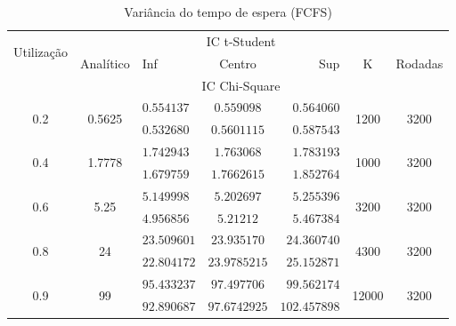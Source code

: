 \documentclass[a4paper]{article}
\begin{document}
\begin{table}[h!]
    \centering
    \begin{tabular}{|c|c|lcr|c|c|}\hline
        \multirow{2}{4.35em}{Utilização}
            & \multirow{3}{3.95em}{Analítico}
            & \multicolumn{3}{|c|}{IC t-Student}
            & \multirow{3}{1em}{K}
            & \multirow{3}{3.75em}{Rodadas} \\
        && Inf & Centro & Sup &&\\
        && \multicolumn{3}{|c|}{IC Chi-Square} &&\\\hline
        \multirow{2}{2em}{0.2}
            &\multirow{2}{3em}{0.5625}
            &$ 0.554137 $&$ 0.559098 $&$ 0.564060 $
            &\multirow{2}{2em}{1200} & \multirow{2}{2em}{3200}\\
            &&$ 0.532680 $&$ 0.5601115 $&$ 0.587543 $&&\\\hline
        \multirow{2}{2em}{0.4}
            &\multirow{2}{3em}{1.7778}
            &$ 1.742943 $&$ 1.763068 $&$ 1.783193 $
            &\multirow{2}{2em}{1000} & \multirow{2}{2em}{3200}\\
            &&$ 1.679759 $&$ 1.7662615 $&$ 1.852764 $&&\\\hline
        \multirow{2}{2em}{0.6}
            &\multirow{2}{2em}{5.25}
            &$ 5.149998 $&$ 5.202697 $&$ 5.255396 $
            &\multirow{2}{2em}{3200} & \multirow{2}{2em}{3200}\\
            &&$ 4.956856 $&$ 5.21212  $&$ 5.467384 $&&\\\hline
        \multirow{2}{2em}{0.8}
            &\multirow{2}{2em}{24}
            &$ 23.509601 $&$ 23.935170 $&$ 24.360740 $
            &\multirow{2}{2em}{4300} & \multirow{2}{2em}{3200}\\
            &&$ 22.804172 $&$ 23.9785215 $&$ 25.152871 $&&\\\hline
        \multirow{2}{2em}{0.9}
            &\multirow{2}{2em}{99}
            &$ 95.433237 $&$ 97.497706 $&$ 99.562174 $
            &\multirow{2}{2.5em}{12000} & \multirow{2}{2em}{3200}\\
            &&$ 92.890687 $&$ 97.6742925 $&$ 102.457898 $&&\\\hline
    \end{tabular}
    \caption{Variância do tempo de espera (FCFS)}
\end{table}
\end{document}

